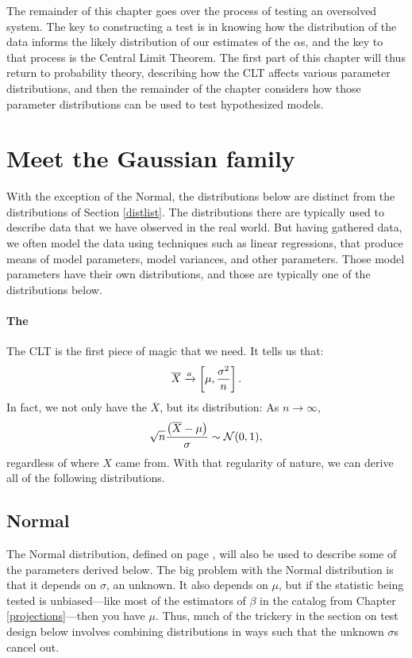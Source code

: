 The remainder of this chapter goes over the process of testing 
an oversolved system. The key to constructing a test is in knowing 
how the distribution of the data informs the likely distribution of
our estimates of the $\alpha$s, and the key to that process is the
Central Limit Theorem. The first part of this chapter will thus return
to probability theory, describing how the CLT affects various parameter
distributions, and then the remainder of the chapter considers how 
those parameter distributions can be used to test hypothesized models.

\section{Meet the Gaussian family} \label{dist2}
With the exception of the Normal, the distributions below are distinct
from the distributions of Section \ref{distlist}. The distributions
there
are typically used to describe data that we have observed in the real
world. But having gathered data, we often model the data using techniques
such as linear regressions, that produce means of model parameters,
model variances, and other parameters. Those model parameters have their
own distributions, and those are typically one of the distributions below.


\paragraph{The } The CLT is the first piece of magic
that we need. It tells us that:
$$\overline X \xrightarrow{a} \left[\mu,{\sigma^2\over n}\right].$$
In fact, we not only have the $\overline X$, but its distribution:
As $n\to \infty$, $$\sqrt{n} \frac{\left(\overline X - \mu\right)}{\sigma} \sim {\cal N}(0,1),$$ 
regardless of where $X$ came from. With that regularity of nature,
we can derive all of the following distributions.  \label{CLT}

\subsection{Normal} 

The Normal distribution, defined on page \pageref{normal},
will also be used to describe some of the parameters derived below.
The big problem with the Normal distribution is that it depends on $\sigma$, an
unknown. It also depends on $\mu$, but if the statistic
being tested is unbiased---like most of the estimators of $\beta$ in the
catalog from Chapter \ref{projections}---then you have $\mu$. Thus, much of the trickery in the
section on test design below involves combining distributions in ways
such that the unknown $\sigma$s cancel out.

